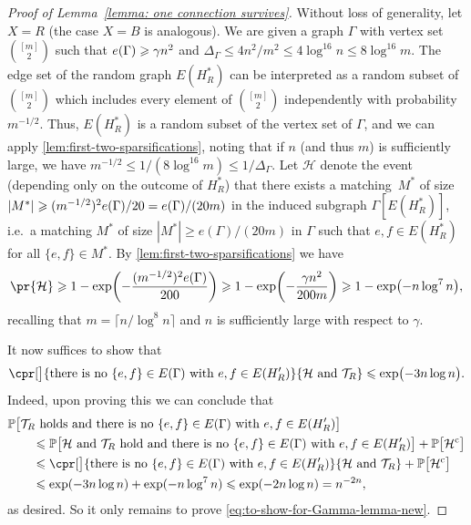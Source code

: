 \documentclass[11pt,reqno,oneside]{amsart}
\theoremstyle{definition}
\newcommand\1{\mathbf{1}}
\newcommand{\cH}{\mathcal{H}}
\DeclarePairedDelimiter{\paren}{\lparen}{\rparen}
\newcommand{\comp}{\textup{c}}
\let\leq\leqslant
\let\geq\geqslant
\begin{document}
\begin{proof}[Proof of Lemma~\ref{lemma: one connection survives}]
Without loss of generality, let $X=R$ (the case $X=B$ is analogous). We are given a graph $\Gamma$ with vertex set $\binom{[m]}2$ such that $e\paren{\Gamma}\geq \gamma n^2$ and $\Delta_\Gamma \leq 4n^2/m^2 \leq 4\log^{16} n \leq 8 \log^{16}m$. The edge set of the random graph $E(H^*_R)$ can be interpreted as a random subset of $\binom{[m]}2$ which includes every element of $\binom{[m]}2$ independently with probability $m^{-1/2}$. Thus, $E(H^*_R)$ is a random subset of the vertex set of $\Gamma$, and we can apply \cref{lem:first-two-sparsifications}, noting that if $n$ (and thus $m$) is sufficiently large, we have $m^{-1/2}\leq 1/(8 \log^{16}m)\leq 1/\Delta_\Gamma$. Let $\cH$ denote the event (depending only on the outcome of $H^*_R$) that there exists a matching~$M^*$ of size $|M^*|\geq (m^{-1/2})^2e\paren{\Gamma}/20=e(\Gamma)/(20m)$
in the induced subgraph $\Gamma[E(H^*_R)]$, i.e.\ a matching $M^*$ of size $|M^*|\geq e(\Gamma)/(20m)$
in $\Gamma$ such that $e,f\in E(H^*_R)$ for all $\{e,f\}\in M^*$. By \cref{lem:first-two-sparsifications} we have
\begin{equation*}
    \pr{\cH}\geq 1-\exp\paren[\bigg]{-\frac{(m^{-1/2})^2e(\Gamma)}{200}}
    \geq 1-\exp\paren[\bigg]{-\frac{\gamma n^2}{200m}}\geq 1-\exp\paren[\big]{-n\log^{7}n},
\end{equation*}
recalling that $m=\lceil n/{\log^{8}n}\rceil$ and $n$ is sufficiently large with respect to $\gamma$. 

It now suffices to show that
\begin{equation}\label{eq:to-show-for-Gamma-lemma-new}
\cpr[\big]{\text{there is no }\{e,f\} \in E(\Gamma)\text{ with }e,f \in E(H'_R)}{\cH\text{ and }\mathcal T_R}\leq \exp\paren[\big]{-3n\log n}.
\end{equation}
Indeed, upon proving this we can conclude that 
\begin{align*}
    &\mathbb P\big[\mathcal T_R\text{ holds and there is no }\{e,f\} \in E(\Gamma)\text{ with }e,f \in E(H'_R)\big]\\
    &\qquad\leq \mathbb P\big[\cH\text{ and }\mathcal T_R\text{ hold and there is no }\{e,f\} \in E(\Gamma)\text{ with }e,f \in E(H'_R)\big]+\mathbb P\big[\cH^\comp\big]\\
    &\qquad\leq \cpr[\big]{\text{there is no }\{e,f\} \in E(\Gamma)\text{ with }e,f \in E(H'_R)}{\cH\text{ and }\mathcal T_R}+\mathbb P\big[\cH^\comp\big]\\
    &\qquad\leq \exp(-3n\log n)+ \exp(-n\log^7 n)\leq \exp(-2n\log n)=n^{-2n},
\end{align*}
as desired. So it only remains to prove \cref{eq:to-show-for-Gamma-lemma-new}.


\end{proof}
\end{document}
